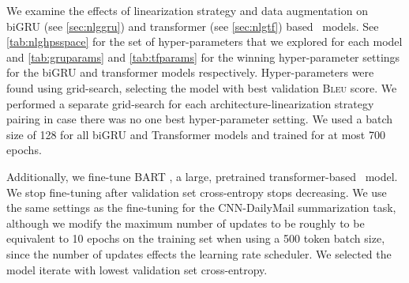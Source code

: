 We examine the effects of linearization strategy and data augmentation on biGRU
(see \autoref{sec:nlggru}) and transformer (see \autoref{sec:nlgtf}) based
\sequencetosequence~models.  See \autoref{tab:nlghpsspace} for the set of
hyper-parameters that we explored for each model and \autoref{tab:gruparams}
and \autoref{tab:tfparams} for the winning hyper-parameter settings for the
biGRU and transformer models respectively.  Hyper-parameters were found using
grid-search, selecting the model with best validation \textsc{Bleu} score. We
performed a separate grid-search for each architecture-linearization strategy
pairing in case there was no one best hyper-parameter setting.  We used a batch
size of 128 for all biGRU and Transformer models and trained for at most 700
epochs.






\newcommand{\utt}{\ensuremath{\mathbf{y}}}
\newcommand{\uttVocab}{\ensuremath{\mathcal{W}}}
\newcommand{\da}{\ensuremath{a}}
\newcommand{\inseq}{\mathbf{x}}
\newcommand{\Attrs}{\ensuremath{\mathcal{V}}}
\newcommand{\inSize}{m}
\newcommand{\outSize}{n}

\newcommand{\mmhAttn}{\operatorname{maskedMHAttn}}
\newcommand{\mhAttn}{\operatorname{MHAttn}}

\newcommand{\mrEmb}{\mathbf{W}}
\newcommand{\uttEmb}{\mathbf{V}}
\newcommand{\decInput}{\mathbf{G}}
\newcommand{\decInputi}{\mathbf{g}_i}


\newcommand{\tfeA}{\boldsymbol{\check{\encInput}}^{(i)}}
\newcommand{\tfeB}{\boldsymbol{\bar{\encInput}}^{(i)}}
\newcommand{\tfeC}{\boldsymbol{\hat{\encInput}}^{(i)}}
\newcommand{\tfeD}{\boldsymbol{\dot{\encInput}}^{(i)}}
\newcommand{\tfeE}{\boldsymbol{\ddot{\encInput}}^{(i)}}

\newcommand{\tfdA}{\boldsymbol{\check{\decInput}}^{(i)}}
\newcommand{\tfdB}{\boldsymbol{\bar{\decInput}}^{(i)}}
\newcommand{\tfdC}{\boldsymbol{\hat{\decInput}}^{(i)}}
\newcommand{\tfdD}{\boldsymbol{\grave{\decInput}}^{(i)}}
\newcommand{\tfdE}{\boldsymbol{\tilde{\decInput}}^{(i)}}
\newcommand{\tfdF}{\boldsymbol{\acute{\decInput}}^{(i)}}
\newcommand{\tfdG}{\boldsymbol{\dot{\decInput}}^{(i)}}
\newcommand{\tfdH}{\boldsymbol{\ddot{\decInput}}^{(i)}}

Additionally, we fine-tune BART \cite{lewis2020}, a large, pretrained
transformer-based \sequencetosequence~model. We stop fine-tuning after
validation set cross-entropy stops decreasing.  We use the same settings as the
fine-tuning for the CNN-DailyMail summarization task, although we modify the
maximum number of updates to be roughly to be equivalent to 10 epochs on the
training set when using a 500 token batch size, since the number of updates
effects the learning rate scheduler. We selected the model iterate with lowest
validation set cross-entropy.


